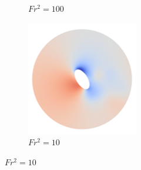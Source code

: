 \begin{figure}
\begin{subfigure}[b]{0.25\textwidth}
        \caption{$Fr^2 = 100$}
        \label{fig:par0p5fs100}
    \end{subfigure}
    \hfill
    \begin{subfigure}[b]{0.25\textwidth}
        \centering
        \includegraphics[width=\textwidth]{images/spinning_ellipse/par0p5fs10.png}
        \caption{$Fr^2 = 10$}
        \label{fig:par0p5fs10}
    \end{subfigure}
    

\end{figure}

